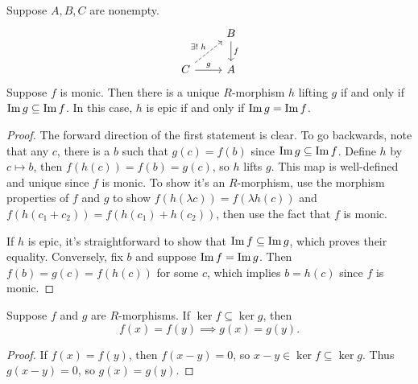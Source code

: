\documentclass[twoside,10pt]{report}
\begin{document}
\begin{prop}
	\label{prop:unique-lift}
Suppose $A, B, C$ are nonempty.
\[
\begin{tikzcd}
	& B \dar{f} \\
	C \arrow[ur, dashed, "\exists! \;h"] \rar{g} & A
\end{tikzcd}
\] 
Suppose $f$ is monic. Then there is a unique $R$-morphism $h$ lifting $g$ if and only if $\operatorname{Im} g \subseteq \operatorname{Im} f$. In this case, $h$ is epic if and only if $\operatorname{Im} g = \operatorname{Im} f$.
\end{prop}
\begin{proof}
	The forward direction of the first statement is clear. To go backwards, note that any $c$, there is a $b$ such that $g(c) = f(b)$ since $\operatorname{Im} g \subseteq \operatorname{Im} f$. Define $h$ by $c \mapsto b$, then $f(h(c)) = f(b)=g(c)$, so $h$ lifts $g$. This map is well-defined and unique since $f$ is monic. To show it's an $R$-morphism, use the morphism properties of $f$ and $g$ to show $f(h(\lambda c)) = f(\lambda h(c))$ and $f(h(c_1+c_2)) = f(h(c_1)+h(c_2))$, then use the fact that $f$ is monic.

	If $h$ is epic, it's straightforward to show that $\operatorname{Im} f \subseteq \operatorname{Im} g$, which proves their equality. Conversely, fix $b$ and suppose $\operatorname{Im} f = \operatorname{Im} g$. Then $f(b) = g(c) = f(h(c))$ for some $c$, which implies $b = h(c)$ since $f$ is monic.
\end{proof}

\begin{lem}
Suppose $f$ and $g$ are $R$-morphisms. If $\ker f \subseteq \ker g$, then
\[
	f(x) = f(y) \implies g(x) = g(y).
\] 
\end{lem}
\begin{proof}
	If $f(x) = f(y)$, then $f(x-y)=0$, so $x-y \in \ker f \subseteq \ker g$. Thus $g(x-y) = 0$, so $g(x)=g(y)$.
\end{proof}
\end{document}
